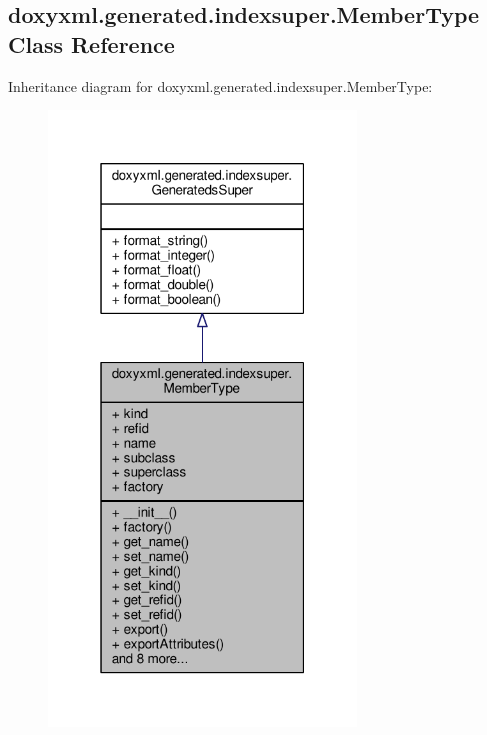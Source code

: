 \subsection{doxyxml.\+generated.\+indexsuper.\+Member\+Type Class Reference}
\label{classdoxyxml_1_1generated_1_1indexsuper_1_1MemberType}


Inheritance diagram for doxyxml.\+generated.\+indexsuper.\+Member\+Type\+:
\nopagebreak
\begin{figure}[H]
\begin{center}
\leavevmode
\includegraphics[width=232pt]{d2/dba/classdoxyxml_1_1generated_1_1indexsuper_1_1MemberType__inherit__graph}
\end{center}
\end{figure}


